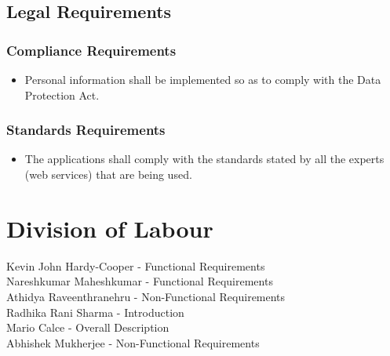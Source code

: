 \documentclass[]{article}
\begin{document}
\subsection{Legal Requirements}
\label{sub:legal_requirements}

\subsubsection{Compliance Requirements}
\label{ssub:compliance_requirements}
\begin{itemize}
	\item Personal information shall be implemented so as to comply with the
	Data Protection Act.
\end{itemize}

\subsubsection{Standards Requirements}
\label{ssub:standards_requirements}
\begin{itemize}
	\item The applications shall comply with the standards stated by all the experts (web services) that are being used.
\end{itemize}



\appendix
\section{Division of Labour}
\label{sec:division_of_labour}
Kevin John Hardy-Cooper - Functional Requirements\\
Nareshkumar Maheshkumar - Functional Requirements\\
Athidya Raveenthranehru - Non-Functional Requirements\\
Radhika Rani Sharma - Introduction\\
Mario Calce - Overall Description\\
Abhishek Mukherjee - Non-Functional Requirements\\
\end{document}
